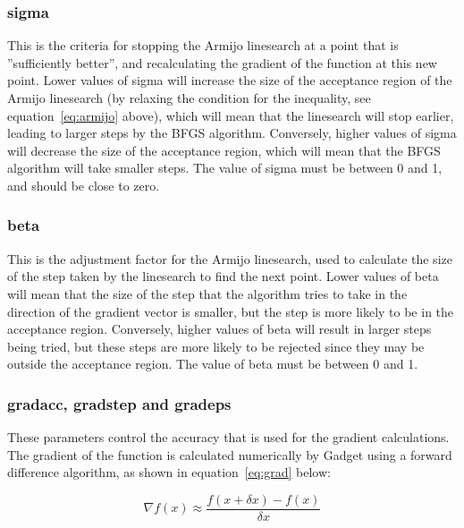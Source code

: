 \documentclass[10pt,twoside]{book}
\begin{document}
\subsubsection{sigma}
This is the criteria for stopping the Armijo linesearch at a point that is ''sufficiently better'', and recalculating the gradient of the function at this new point.  Lower values of sigma will increase the size of the acceptance region of the Armijo linesearch (by relaxing the condition for the inequality, see equation~\ref{eq:armijo} above), which will mean that the linesearch will stop earlier, leading to larger steps by the BFGS algorithm.  Conversely, higher values of sigma will decrease the size of the acceptance region, which will mean that the BFGS algorithm will take smaller steps.  The value of sigma must be between 0 and 1, and should be close to zero.

\subsubsection{beta}
This is the adjustment factor for the Armijo linesearch, used to calculate the size of the step taken by the linesearch to find the next point.  Lower values of beta will mean that the size of the step that the algorithm tries to take in the direction of the gradient vector is smaller, but the step is more likely to be in the acceptance region.  Conversely, higher values of beta will result in larger steps being tried, but these steps are more likely to be rejected since they may be outside the acceptance region.  The value of beta must be between 0 and 1.


\subsubsection{gradacc, gradstep and gradeps}
These parameters control the accuracy that is used for the gradient calculations.  The gradient of the function is calculated numerically by Gadget using a forward difference algorithm, as shown in equation~\ref{eq:grad} below:

\begin{equation}\label{eq:grad}
\nabla f(x) \approx \frac{f(x + \delta x) - f(x)} {\delta x}
\end{equation}
\end{document}
